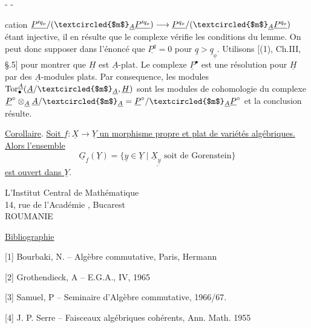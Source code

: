 \begin{center}-  -\end{center}

cation $\underline{P'^{q_o}}/(\textcircled{$m$}_{\underline A}\underline{P'^{q_o}})\longrightarrow\underline{P^{q_o}}/(\textcircled{$m$}_{\underline A}\underline{P^{q_o}})$ étant injective, il en résulte que le complexe
vérifie les conditions du lemme. On peut donc supposer dans l'énoncé que $\underline{P^q}=0$ pour $\underline q>\underline q_{\underline o}$. Utilisons [(1), Ch.III, §.5] pour montrer que $\underline H$ est $\underline A$-plat. Le complexe $\underline P^\bullet$ est une résolution pour $\underline H$ par des $\underline A$-modules plats. Par consequence, les modules $\operatorname{Tor}^{\underline A}_{\bullet}(\underline A/\textcircled{$m$}_{\underline A},\underline H)$ sont les modules de cohomologie du complexe $\underline P^\circ\otimes_{\underline A}\underline A/\textcircled{$m$}_{\underline A}=\underline P^\circ/\textcircled{$m$}_{\underline A}\underline P^\circ$ et la conclusion résulte.

\uline{Corollaire}. \uline{Soit $\underline f:\underline X\longrightarrow\underline Y$ un morphisme propre et plat de variétés algébriques. Alors l'ensemble}
\[
\underline{\underline G_{\underline f}(\underline Y)=\{\underline y\in\underline Y\mid\underline X_{\underline y}\text{ soit de Gorenstein}\}}
\]
\uline{est ouvert dans $\underline Y$}.

\begin{flushright}
L'Institut Central de Mathématique\\
14, rue de l'Académie , Bucarest\\
ROUMANIE
\end{flushright}


\uline{Bibliographie}

[1] Bourbaki, N. -- Algèbre commutative, Paris, Hermann 

[2] Grothendieck, A -- E.G.A., IV, 1965

[3] Samuel, P -- Seminaire d'Algèbre commutative, 1966/67.

[4] J. P. Serre -- Faisceaux algébriques cohérents, Ann. Math. 1955
